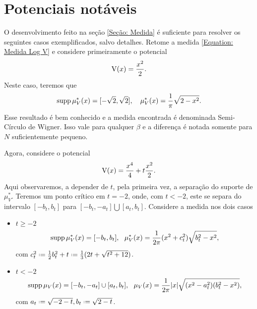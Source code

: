 \section{Potenciais notáveis}
\label{Section: Potencias}

 O desenvolvimento feito na seção \ref{Seção: Medida} é suficiente para resolver os seguintes casos exemplificados, salvo detalhes. Retome a medida \ref{Equation: Medida Log V} e considere primeiramente o potencial $$\operatorname{V}(x) = \frac{x^2}{2}.$$ Neste caso, teremos que
\begin{equation}
	 \supp{\mu^*_V(x)} = [-\sqrt{2}, \sqrt{2}], \ \ \ \mu^*_V(x) = \frac{1}{\pi} \sqrt{2 - x^2}.
	 \label{Equação: Quadrático}
\end{equation}
Esse resultado é bem conhecido e a medida encontrada é denominada Semi-Círculo de Wigner. Isso vale para qualquer $\beta$ e a diferença é notada somente para $N$ suficientemente pequeno.

Agora, considere o potencial $$\operatorname{V}(x) = \frac{x^4}{4} + t \frac{x^2}{2}.$$ Aqui observaremos, a depender de $t$, pela primeira vez, a separação do suporte de $\mu^*_V$. Teremos um ponto crítico em $t=-2$, onde, com $t < -2$, este se separa do intervalo $[-b_t, b_t]$ para $[-b_t, -a_t] \bigcup [a_t, b_t]$. Considere a medida nos dois casos
\begin{itemize}
	\item \(t \geq -2\)
	\begin{equation}
	\supp \mu^*_V(x) = [-b_t, b_t], \ \ \mu^*_V(x) = \frac{1}{2\pi} (x^2 + c_t^2) \sqrt{b_t^2 - x^2},\label{Equação: Quartico +}
	\end{equation}
	com $c_t^2 \deff\frac{1}{2} b_t^2 + t \deff \frac{1}{3} (2t + \sqrt{t^2 + 12})$.
	\item \(t < -2\)
	\begin{equation}
	\operatorname{supp} \mu_V(x) = [-b_t, -a_t] \cup [a_t, b_t], \ \ \mu_V(x) = \frac{1}{2\pi} |x| \sqrt{(x^2 - a_t^2)(b_t^2 - x^2)},
	\label{Equação: Quartico -}
	\end{equation}
	com $ a_t \deff \sqrt{-2-t}, b_t \deff \sqrt{2-t}$.
\end{itemize}




